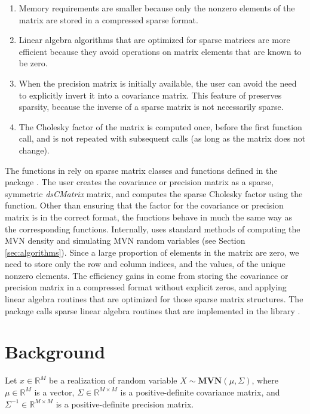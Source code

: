 \documentclass[codesnippet,nojss]{jss}\usepackage[]{graphicx}\usepackage[]{color}
\newcommand{\func}[1]{\code{#1}}
\newcommand{\class}[1]{\textsl{#1}}
\newcommand{\MVN}[1]{\mathbf{MVN}\!\left(#1\right)}
\newcommand{\Real}[1]{\mathbb{R}^{#1}}
\begin{document}
\begin{enumerate}
\item Memory requirements are smaller because only the nonzero
  elements of the matrix are stored in a compressed sparse format.
\item Linear algebra algorithms that are optimized for sparse matrices
  are more efficient because they avoid operations on matrix elements that are known to be zero.
\item When the precision matrix is initially available, the user can avoid the need to explicitly invert it into a covariance matrix.
  This feature of  preserves sparsity, because the inverse of a sparse matrix is
  not necessarily sparse.
\item The Cholesky factor of the matrix is computed once, before the
  first  function call, and is not repeated with subsequent calls
  (as long as the matrix does not change).
\end{enumerate}


The functions in  rely on sparse matrix classes and
functions defined in the  package
\citep{R_Matrix}.  The user creates the covariance or precision matrix
as a sparse, symmetric \class{dsCMatrix} matrix, and computes the
sparse Cholesky factor using the \func{Cholesky} function. Other than ensuring that
the factor for the covariance or precision matrix is in the correct
format, the  functions behave
in much the same way as the corresponding  functions.
Internally,  uses
standard methods of computing the MVN density and simulating MVN
random variables (see Section \ref{sec:algorithms}).  Since a large
proportion of elements in the matrix are zero, we need
to store only the row and column indices, and the values, of the
unique nonzero elements.  The efficiency gains in  come from
storing the covariance or precision matrix in a compressed format without
explicit zeros, and applying linear algebra routines that are
optimized for those sparse matrix structures.  The 
package calls sparse linear algebra routines that are implemented in
the  library
\citep{ChenDavis2008,DavisHager1999,DavisHager2009}.



\section{Background}
Let $x\in\Real{M}$ be a realization of random variable
$X\sim\MVN{\mu,\Sigma}$, where $\mu\in\Real{M}$ is a vector,
$\Sigma\in\Real{M\times M}$ is a positive-definite covariance matrix,
and $\Sigma^{-1}\in\Real{M\times M}$ is a positive-definite precision matrix.
\end{document}
